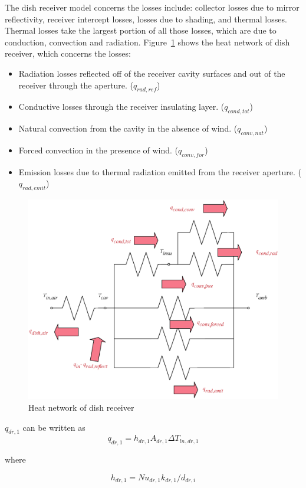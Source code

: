 \documentclass{article}
\begin{document}
The dish receiver model concerns the losses include: collector losses due to mirror reflectivity, receiver intercept losses, losses due to shading, and thermal losses. Thermal losses take the largest portion of all those losses, which are due to conduction, convection and radiation. Figure~\ref{fig:thermal-lose} shows the heat network of dish receiver, which concerns the losses:
\begin{itemize}
	\item Radiation losses reflected off of the receiver cavity surfaces and out of the receiver through the aperture. ($q_{rad,ref}$)
	\item Conductive losses through the receiver insulating layer. ($q_{cond,tot}$)
	\item Natural convection from the cavity in the absence of wind. ($q_{conv,nat}$)
	\item Forced convection in the presence of wind. ($q_{conv,for}$)
	\item Emission losses due to thermal radiation emitted from the receiver aperture. ($q_{rad,emit}$)
\end{itemize}

\noindent \begin{figure}[htbp]
\begin{center}
	\includegraphics[width = 0.7\columnwidth]{./graphics/thermalLosses}
	\caption{Heat network of dish receiver}
	\label{fig:thermal-lose}
\end{center}
\end{figure}

$q_{dr,1}$ can be written as
\begin{equation*}
	q_{dr,1}=h_{dr,1}A_{dr,1}\Delta{}T_{ln,dr,1}
\end{equation*}

where

\begin{equation*}
	h_{dr,1}=Nu_{dr,1}k_{dr,1}/d_{dr,i}
\end{equation*}
\end{document}
